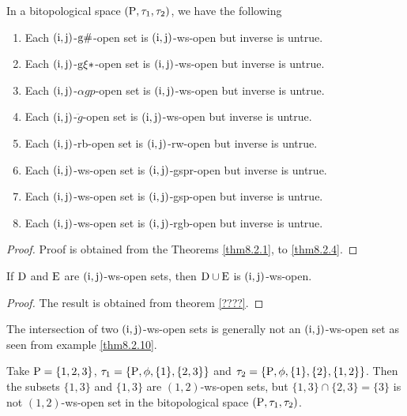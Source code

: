\begin{thm}\label{thm8.3.1}
In a bitopological space $(\mathrm{P}, \tau_1, \tau_2 )$, we have the following
\begin{enumerate}[(1)]
\item Each $(\mathrm{i}, \mathrm{j})$-$\mathrm{g}\#$-open set is $(\mathrm{i}, \mathrm{j})$-ws-open but inverse is untrue.
\item Each $(\mathrm{i}, \mathrm{j})$-$\mathrm{g}\xi*$-open set is $(\mathrm{i}, \mathrm{j})$-ws-open but inverse is untrue.
\item Each $(\mathrm{i}, \mathrm{j})$-$\alpha gp$-open set is $(\mathrm{i}, \mathrm{j})$-ws-open but inverse is untrue.
\item Each $(\mathrm{i}, \mathrm{j})$-$\ddot{g}$-open set is $(\mathrm{i}, \mathrm{j})$-ws-open but inverse is untrue.
\item Each $(\mathrm{i}, \mathrm{j})$-rb-open set is $(\mathrm{i}, \mathrm{j})$-rw-open but inverse is untrue.
\item Each $(\mathrm{i}, \mathrm{j})$-ws-open set is $(\mathrm{i}, \mathrm{j})$-gspr-open but inverse is untrue.
\item Each $(\mathrm{i}, \mathrm{j})$-ws-open set is $(\mathrm{i}, \mathrm{j})$-gsp-open but inverse is untrue.
\item Each $(\mathrm{i}, \mathrm{j})$-ws-open set is $(\mathrm{i}, \mathrm{j})$-rgb-open but inverse is untrue.
\end{enumerate}
\end{thm}

\begin{proof}
Proof is obtained from the Theorems \ref{thm8.2.1}, to \ref{thm8.2.4}.
\end{proof}

\begin{thm}\label{thm8.3.2}
If $\mathrm{D}$ and $\mathrm{E}$ are $(\mathrm{i}, \mathrm{j})$-ws-open sets, then $\mathrm{D}\cup \mathrm{E}$ is $(\mathrm{i}, \mathrm{j})$-ws-open.
\end{thm}

\begin{proof}
The result is obtained from theorem \ref{????}.
\end{proof}

\begin{rem}\label{rem8.3.1}
The intersection of two $(\mathrm{i}, \mathrm{j})$-ws-open sets is generally not an $(\mathrm{i}, \mathrm{j})$-ws-open set as seen from example \ref{thm8.2.10}.
\end{rem}

\begin{exm}\label{exam8.3.1}
Take $\mathrm{P}=\{ 1, 2, 3\}$, $\tau_1 =\{\mathrm{P}, \phi, \{1\}, \{2,3\}\}$ and $\tau_2 =\{\TSP, \phi, \{1\}, \{2\},\break \{1, 2\}\}$. Then the subsets $\{1, 3\}$ and $\{1, 3\}$ are $(1, 2)$-ws-open sets, but $\{1, 3\}\cap \{2,3\}=\{3\}$ is not $(1, 2)$-ws-open set in the bitopological space $(\mathrm{P}, \tau_1, \tau_2 )$.
\end{exm}

